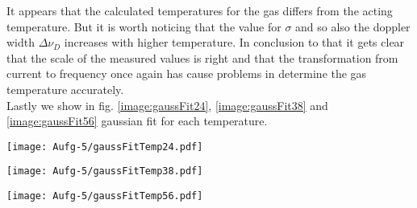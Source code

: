 It appears that the calculated temperatures for the gas differs from the acting temperature. But it is worth noticing that the value for $\sigma$ and so also the doppler width $\Delta\nu_D$ increases with higher temperature. In conclusion to that it gets clear that the scale of the measured values is right and that the transformation from current to frequency once again has cause problems in determine the gas temperature accurately.\\

Lastly we show in fig. \ref{image:gaussFit24}, \ref{image:gaussFit38} and \ref{image:gaussFit56} gaussian fit for each temperature.
\begin{center}
    \texttt{[image: Aufg-5/gaussFitTemp24.pdf]}
    \label{image:gaussFit24}
\end{center}
\begin{center}
    \texttt{[image: Aufg-5/gaussFitTemp38.pdf]}
    \label{image:gaussFit38}
\end{center}
\begin{center}
    \texttt{[image: Aufg-5/gaussFitTemp56.pdf]}
    \label{image:gaussFit56}
\end{center}